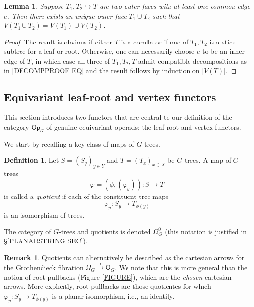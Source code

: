 \documentclass[a4paper,10pt
,draft
]{article}%
\numberwithin{equation}{section}
\numberwithin{figure}{section}
\newtheorem{lemma}[equation]{Lemma}%
\theoremstyle{definition} %
\newtheorem{definition}[equation]{Definition}%
\newtheorem{remark}[equation]{Remark}%
\newcommand{\1}{\ensuremath{\mathbbm 1}}%
\begin{document}
\begin{lemma}\label{OUTERFACEUNION LEM}
	Suppose $T_1,T_2 \hookrightarrow T$ are two outer faces with at least one common edge $e$. Then there exists an unique outer face $T_1 \cup T_2$ such that 
	$V(T_1 \cup T_2) = V(T_1) \cup V(T_2)$.
\end{lemma}

\begin{proof}
	The result is obvious if either
	$T$ is a corolla or if one of $T_1,T_2$
	is a stick subtree for a leaf or root.
%
	Otherwise, one can necessarily choose $e$ to be an inner edge of $T$, in which case all three of $T_1,T_2,T$ admit compatible decompositions as in \eqref{DECOMPPROOF EQ} and the result follows by induction on $|V(T)|$.
\end{proof}



\subsection{Equivariant leaf-root and vertex functors}\label{LRVERT SEC}


This section introduces two functors that are central to our definition of the category $\mathsf{Op}_G$ of
genuine equivariant operads: the leaf-root and vertex functors.

We start by recalling a key class of maps of $G$-trees.


\begin{definition}\label{QUOT DEF}
	Let $S = (S_y)_{y \in Y}$ and $T = (T_x)_{x \in X}$
	be $G$-trees.
	A map of $G$-trees 
	\[
	\varphi = (\phi, (\varphi_y))\colon S \to T
	\]
	is called a \textit{quotient} if each of the constituent tree maps
	\[
	\varphi_y \colon S_y \to T_{\phi(y)}
	\]
is an isomorphism of trees.	

The category of $G$-trees and quotients is denoted $\Omega_{G}^0$ (this notation is justified in \S \ref{PLANARSTRING SEC}).
\end{definition}


\begin{remark}
	Quotients can alternatively be described as the cartesian arrows for the Grothendieck fibration
	$\Omega_G \xrightarrow{\mathsf{r}} \mathsf{O}_G$.
	We note that this is more general than the notion of root pullbacks (Figure \ref{FIGURE}), which are the \textit{chosen} cartesian arrows.
	More explicitly,
	root pullbacks are those quotientes for which
	$\varphi_y \colon S_y \to T_{\phi(y)}$
	is a planar isomorphism, i.e., an identity.
\end{remark}
\end{document}
